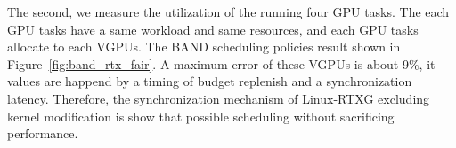 The second, we measure the utilization of the running four GPU tasks.
The each GPU tasks have a same workload and same resources, and each GPU tasks allocate to each VGPUs.
The BAND scheduling policies result shown in Figure~\ref{fig:band_rtx_fair}.
A maximum error of these VGPUs is about 9\%, it values are happend by a timing of budget replenish and a synchronization latency.  
Therefore, the synchronization mechanism of Linux-RTXG excluding kernel modification is show that possible scheduling without sacrificing performance.





